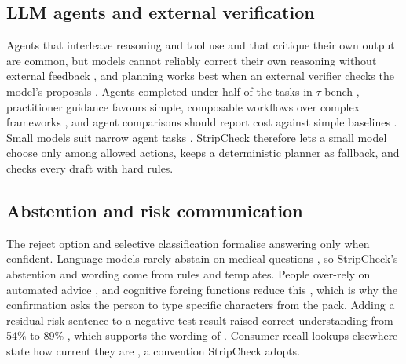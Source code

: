\subsection{LLM agents and external verification}
Agents that interleave reasoning and tool use \cite{yao2023react,schick2023toolformer} and that critique their own output \cite{shinn2023reflexion,madaan2023selfrefine} are common, but models cannot reliably correct their own reasoning without external feedback \cite{huang2024cannot}, and planning works best when an external verifier checks the model's proposals \cite{kambhampati2024llmmodulo}. Agents completed under half of the tasks in $\tau$-bench \cite{yao2024taubench}, practitioner guidance favours simple, composable workflows over complex frameworks \cite{schluntz2024building}, and agent comparisons should report cost against simple baselines \cite{kapoor2024agents}. Small models suit narrow agent tasks \cite{belcak2025slm}. StripCheck therefore lets a small model choose only among allowed actions, keeps a deterministic planner as fallback, and checks every draft with hard rules.

\subsection{Abstention and risk communication}
The reject option \cite{chow1970reject} and selective classification \cite{geifman2017selective} formalise answering only when confident. Language models rarely abstain on medical questions \cite{cocchieri2026abstain}, so StripCheck's abstention and wording come from rules and templates. People over-rely on automated advice \cite{parasuraman2010complacency}, and cognitive forcing functions reduce this \cite{bucinca2021trust}, which is why the confirmation asks the person to type specific characters from the pack. Adding a residual-risk sentence to a negative test result raised correct understanding from 54\% to 89\% \cite{batteux2022residual}, which supports the wording of \NLISTED. Consumer recall lookups elsewhere state how current they are \cite{ecfr2026vin}, a convention StripCheck adopts.
